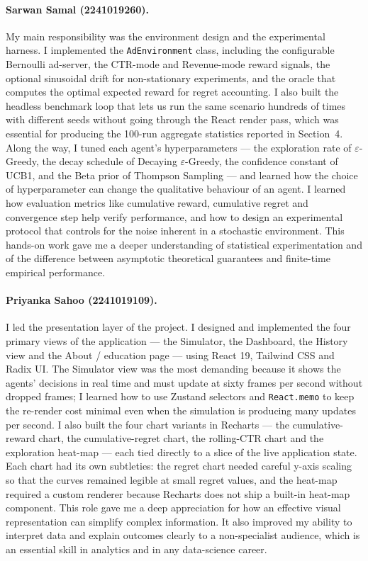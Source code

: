\paragraph{Sarwan Samal (2241019260).}
My main responsibility was the environment design and the experimental harness. I implemented the \texttt{AdEnvironment} class, including the configurable Bernoulli ad-server, the CTR-mode and Revenue-mode reward signals, the optional sinusoidal drift for non-stationary experiments, and the oracle that computes the optimal expected reward for regret accounting. I also built the headless benchmark loop that lets us run the same scenario hundreds of times with different seeds without going through the React render pass, which was essential for producing the 100-run aggregate statistics reported in Section~4. Along the way, I tuned each agent's hyperparameters --- the exploration rate of $\varepsilon$-Greedy, the decay schedule of Decaying $\varepsilon$-Greedy, the confidence constant of UCB1, and the Beta prior of Thompson Sampling --- and learned how the choice of hyperparameter can change the qualitative behaviour of an agent. I learned how evaluation metrics like cumulative reward, cumulative regret and convergence step help verify performance, and how to design an experimental protocol that controls for the noise inherent in a stochastic environment. This hands-on work gave me a deeper understanding of statistical experimentation and of the difference between asymptotic theoretical guarantees and finite-time empirical performance.

\paragraph{Priyanka Sahoo (2241019109).}
I led the presentation layer of the project. I designed and implemented the four primary views of the application --- the Simulator, the Dashboard, the History view and the About / education page --- using React 19, Tailwind CSS and Radix UI. The Simulator view was the most demanding because it shows the agents' decisions in real time and must update at sixty frames per second without dropped frames; I learned how to use Zustand selectors and \texttt{React.memo} to keep the re-render cost minimal even when the simulation is producing many updates per second. I also built the four chart variants in Recharts --- the cumulative-reward chart, the cumulative-regret chart, the rolling-CTR chart and the exploration heat-map --- each tied directly to a slice of the live application state. Each chart had its own subtleties: the regret chart needed careful y-axis scaling so that the curves remained legible at small regret values, and the heat-map required a custom renderer because Recharts does not ship a built-in heat-map component. This role gave me a deep appreciation for how an effective visual representation can simplify complex information. It also improved my ability to interpret data and explain outcomes clearly to a non-specialist audience, which is an essential skill in analytics and in any data-science career.

